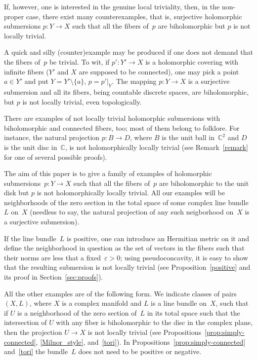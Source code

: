\documentclass[11pt]{amsart}
\newcommand*{\C}{{\mathbb C}}
\let\eps\varepsilon
\theoremstyle{remark}
\theoremstyle{definition}
\begin{document}
If, however, one is interested in the genuine local triviality, then,
in the non-proper case, there exist many counterexamples, that is,
surjective holomorphic submersions $p\colon Y\to X$ such that all the
fibers of~$p$ are biholomorphic but $p$ is not locally trivial.

A quick and silly (counter)example may be produced if one does not
demand that the fibers of~$p$ be trivial. To wit, if $p'\colon Y'\to
X$ is a holomorphic covering with infinite fibers ($Y'$ and $X$ are
supposed to be connected), one may pick a point $a\in Y'$ and put
$Y=Y'\setminus\{a\}$, $p=p'|_Y$.  The mapping $p\colon Y\to X$ is a
surjective submersion and all its fibers, being countable discrete
spaces, are biholomorphic, but $p$ is not locally trivial, even
topologically.

There are examples of not locally trivial holomorphic submersions with
biholomorphic and connected fibers, too; most of them belong to
folklore. For instance, the natural projection $p\colon B\to
D$, where $B$ is the unit ball in~$\C^2$ and $D$ is the unit disc
in~$\C$, is not holomorphically locally trivial (see
Remark~\ref{remark} for one of several possible proofs).


The aim of this paper is to give a family of examples of holomorphic
submersions~$p\colon Y\to X$ such that all the fibers of~$p$ are
biholomorphic to the unit disk but $p$ is not holomorphically locally
trivial. All our examples will be neighborhoods of
the zero section in the total space of some complex line bundle~$L$
on~$X$ (needless to say, the natural projection of any such
neigborhood on~$X$ is a surjective submersion).

If the line bundle~$L$ is positive, one can introduce an Hermitian
metric on it and define the neighborhood in question as the set of
vectors in the fibers such that their norms are less that a
fixed~$\eps>0$; using pseudoconcavity, it is easy to show that the
resulting submersion is not locally trivial (see
Proposition~\ref{positive} and its proof in Section~\ref{sec:proofs}).

All the other examples are of the following form. We indicate
classes of pairs~$(X,L)$, where $X$ is a complex manifold and $L$ is a
line bundle on~$X$, such that if $U$ is a neighborhood of the zero
section of~$L$ in its total space such that the intersection of $U$ with any
fiber is biholomorphic to the disc in the complex plane, then the
projection $U\to X$ is not locally trivial (see
Propositions~\ref{prop:simply-connected}, \ref{Milnor_style},
and~\ref{tori}). In Propositions~\ref{prop:simply-connected}
and~\ref{tori} the bundle~$L$ does not need to be positive or negative.
\end{document}

